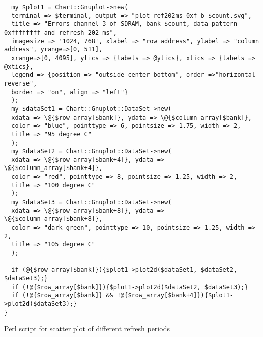 \begin{listing}[H]
\begin{verbatim}
  my $plot1 = Chart::Gnuplot->new(
  terminal => $terminal, output => "plot_ref202ms_0xf_b_$count.svg",
  title => "Errors channel 3 of SDRAM, bank $count, data pattern 0xffffffff and refresh 202 ms",
  imagesize => '1024, 768', xlabel => "row address", ylabel => "column address", yrange=>[0, 511],
  xrange=>[0, 4095], ytics => {labels => @ytics}, xtics => {labels => @xtics},
  legend => {position => "outside center bottom", order =>"horizontal reverse",
  border => "on", align => "left"}
  );
  my $dataSet1 = Chart::Gnuplot::DataSet->new(
  xdata => \@{$row_array[$bank]}, ydata => \@{$column_array[$bank]},
  color => "blue", pointtype => 6, pointsize => 1.75, width => 2,
  title => "95 degree C"
  );
  my $dataSet2 = Chart::Gnuplot::DataSet->new(
  xdata => \@{$row_array[$bank+4]}, ydata => \@{$column_array[$bank+4]},
  color => "red", pointtype => 8, pointsize => 1.25, width => 2,
  title => "100 degree C"
  );
  my $dataSet3 = Chart::Gnuplot::DataSet->new(
  xdata => \@{$row_array[$bank+8]}, ydata => \@{$column_array[$bank+8]},
  color => "dark-green", pointtype => 10, pointsize => 1.25, width => 2,
  title => "105 degree C"
  );
  
  if (@{$row_array[$bank]}){$plot1->plot2d($dataSet1, $dataSet2, $dataSet3);}
  if (!@{$row_array[$bank]}){$plot1->plot2d($dataSet2, $dataSet3);}
  if (!@{$row_array[$bank]} && !@{$row_array[$bank+4]}){$plot1->plot2d($dataSet3);}
}
\end{verbatim}
\caption{Perl script for scatter plot of different refresh periods}
\label{lis:plotref}
\end{listing}

